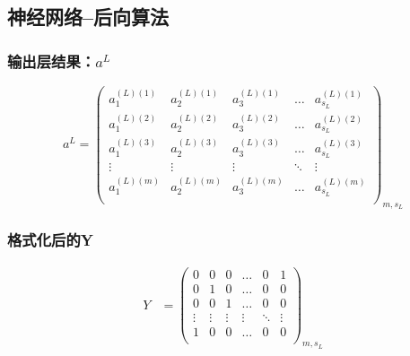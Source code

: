 \subsection{神经网络--后向算法}

\subsubsection{输出层结果：$a^L$}
\begin{equation}
	a^L = 
		\left(\begin{matrix}
			a_1^{(L)(1)} & a_2^{(L)(1)} & a_3^{(L)(1)} & \dots & a_{s_L}^{(L)(1)} \\
			a_1^{(L)(2)} & a_2^{(L)(2)} & a_3^{(L)(2)} & \dots & a_{s_L}^{(L)(2)} \\
			a_1^{(L)(3)} & a_2^{(L)(3)} & a_3^{(L)(3)} & \dots & a_{s_L}^{(L)(3)} \\
			\vdots & \vdots & \vdots & \ddots & \vdots \\
			a_1^{(L)(m)} & a_2^{(L)(m)} & a_3^{(L)(m)} & \dots & a_{s_L}^{(L)(m)} \\
		\end{matrix}\right)_{m,s_L}
\end{equation}

\subsubsection{格式化后的Y}
\begin{equation}\begin{aligned}
	Y &= \left(\begin{matrix}
	        0 & 0 & 0 & \dots & 0 & 1 \\
	        0 & 1 & 0 & \dots & 0 & 0 \\
	        0 & 0 & 1 & \dots & 0 & 0 \\
	        \vdots & \vdots & \vdots & \vdots & \ddots & \vdots \\
	        1 & 0 & 0 & \dots & 0 & 0 \\
		\end{matrix}\right)_{m,s_L}
\end{aligned}\end{equation}


